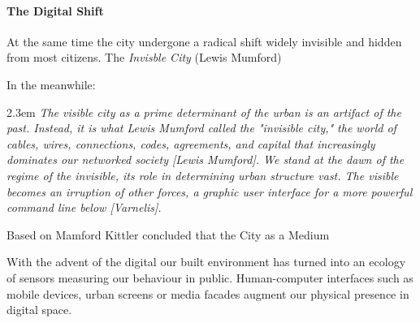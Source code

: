 

\paragraph{The Digital Shift}

At the same time the city undergone a radical shift widely invisible and hidden from most citizens. The \textit{Invisble City}  (Lewis Mumford) 

In the meanwhile: 


\begin{singlespace}
	\leftskip2.3em
		\rightskip\leftskip
			\textit{\small The visible city as a prime determinant of the urban is an artifact of the past. Instead, it is what Lewis Mumford called the "invisible city," the world of cables, wires, connections, codes, agreements, and capital that increasingly dominates our networked society [Lewis Mumford]. We stand at the dawn of the regime of the invisible, its role in determining urban structure vast. The visible becomes an irruption of other forces, a graphic user interface for a more powerful command line below [Varnelis].}
\end{singlespace}


Based on Mamford Kittler concluded that the City as a Medium \cite{Kittler_1996}

With the advent of the digital our built environment has turned into an ecology of sensors measuring our behaviour in public. Human-computer interfaces such as mobile devices, urban screens or media facades augment our physical presence in digital space. 


